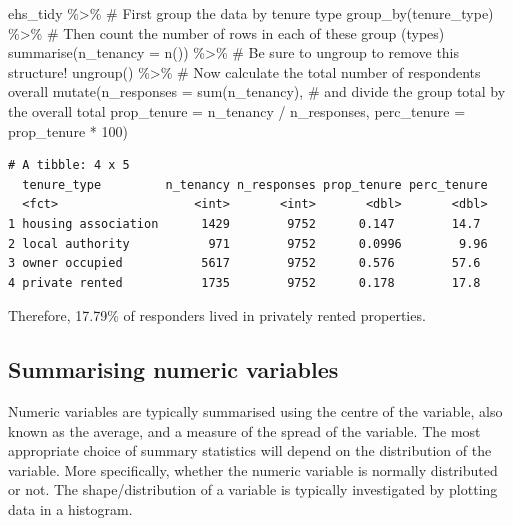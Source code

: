 \documentclass[
  letterpaper,
  DIV=11,
  numbers=noendperiod]{scrreprt}
\newenvironment{Shaded}{\begin{snugshade}}{\end{snugshade}}
\newcommand{\AttributeTok}[1]{\textcolor[rgb]{0.40,0.45,0.13}{#1}}
\newcommand{\CommentTok}[1]{\textcolor[rgb]{0.37,0.37,0.37}{#1}}
\newcommand{\DecValTok}[1]{\textcolor[rgb]{0.68,0.00,0.00}{#1}}
\newcommand{\FunctionTok}[1]{\textcolor[rgb]{0.28,0.35,0.67}{#1}}
\newcommand{\NormalTok}[1]{\textcolor[rgb]{0.00,0.23,0.31}{#1}}
\newcommand{\SpecialCharTok}[1]{\textcolor[rgb]{0.37,0.37,0.37}{#1}}
\begin{document}
\begin{Shaded}
\begin{Highlighting}[]
\NormalTok{ehs\_tidy }\SpecialCharTok{\%\textgreater{}\%} 
  \CommentTok{\# First group the data by tenure type}
  \FunctionTok{group\_by}\NormalTok{(tenure\_type) }\SpecialCharTok{\%\textgreater{}\%} 
  \CommentTok{\# Then count the number of rows in each of these group (types)}
  \FunctionTok{summarise}\NormalTok{(}\AttributeTok{n\_tenancy =} \FunctionTok{n}\NormalTok{()) }\SpecialCharTok{\%\textgreater{}\%} 
  \CommentTok{\# Be sure to ungroup to remove this structure!}
  \FunctionTok{ungroup}\NormalTok{() }\SpecialCharTok{\%\textgreater{}\%} 
  \CommentTok{\# Now calculate the total number of respondents overall }
  \FunctionTok{mutate}\NormalTok{(}\AttributeTok{n\_responses =} \FunctionTok{sum}\NormalTok{(n\_tenancy),}
  \CommentTok{\# and divide the group total by the overall total}
         \AttributeTok{prop\_tenure =}\NormalTok{ n\_tenancy }\SpecialCharTok{/}\NormalTok{ n\_responses,}
         \AttributeTok{perc\_tenure =}\NormalTok{ prop\_tenure }\SpecialCharTok{*} \DecValTok{100}\NormalTok{)}
\end{Highlighting}
\end{Shaded}

\begin{verbatim}
# A tibble: 4 x 5
  tenure_type         n_tenancy n_responses prop_tenure perc_tenure
  <fct>                   <int>       <int>       <dbl>       <dbl>
1 housing association      1429        9752      0.147        14.7 
2 local authority           971        9752      0.0996        9.96
3 owner occupied           5617        9752      0.576        57.6 
4 private rented           1735        9752      0.178        17.8 
\end{verbatim}

Therefore, 17.79\% of responders lived in privately rented properties.

\subsection{Summarising numeric
variables}\label{summarising-numeric-variables}

Numeric variables are typically summarised using the centre of the
variable, also known as the average, and a measure of the spread of the
variable. The most appropriate choice of summary statistics will depend
on the distribution of the variable. More specifically, whether the
numeric variable is normally distributed or not. The shape/distribution
of a variable is typically investigated by plotting data in a histogram.
\end{document}
